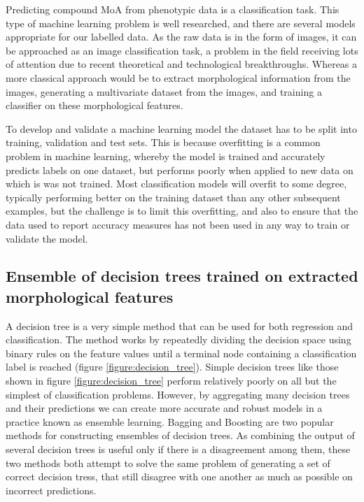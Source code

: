 \documentclass[a4paper,11pt,twoside,openright]{scrbook}
\begin{document}
Predicting compound MoA from phenotypic data is a classification task.
This type of machine learning problem is well researched, and there are several models appropriate for our labelled 
data.
As the raw data is in the form of images, it can be approached as an image classification task, a problem in the field 
receiving lots of attention due to recent theoretical and technological breakthroughs. %
Whereas a more classical approach would be to extract morphological information from the images, generating a 
multivariate dataset from the images, and training a classifier on these morphological features.

To develop and validate a machine learning model the dataset has to be split into training, validation and test sets.
This is because overfitting is a common problem in machine learning, whereby the model is trained and accurately 
predicts labels on one dataset, but performs poorly when applied to new data on which is was not trained.
Most classification models will overfit to some degree, typically performing better on the training dataset than any 
other subsequent examples, but the challenge is to limit this overfitting, and also to ensure that the data used to 
report accuracy measures has not been used in any way to train or validate the model.


\subsection{Ensemble of decision trees trained on extracted morphological features}

A decision tree is a very simple method that can be used for both regression and classification.
The method works by repeatedly dividing the decision space using binary rules on the feature values until a terminal 
node containing a classification label is reached (figure \ref{figure:decision_tree}).
Simple decision trees like those shown in figure \ref{figure:decision_tree} perform relatively poorly on all but the 
simplest of classification problems.
However, by aggregating many decision trees and their predictions we can create more accurate and robust models in a 
practice known as ensemble learning. \cite{Opitz1999}
Bagging \cite{Breiman1996} and Boosting \cite{Freund1996} are two popular methods for constructing ensembles of 
decision trees.
As combining the output of several decision trees is useful only if there is a disagreement among them, these two 
methods both attempt to solve the same problem of generating a set of correct decision tress, that still disagree with 
one another as much as possible on incorrect predictions.
\end{document}
